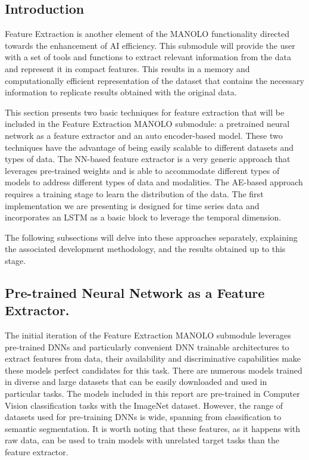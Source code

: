 \subsection{Introduction}

Feature Extraction is another element of the MANOLO functionality directed towards the enhancement of AI efficiency. This submodule will provide the user with a set of tools and functions to extract relevant information from the data and represent it in compact features. This results in a memory and computationally efficient representation of the dataset that contains the necessary information to replicate results obtained with the original data. 

This section presents two basic techniques for feature extraction that will be included in the Feature Extraction MANOLO submodule: a pretrained neural network as a feature extractor and an auto encoder-based model. These two techniques have the advantage of being easily scalable to different datasets and types of data. The NN-based feature extractor is a very generic approach that leverages pre-trained weights and is able to accommodate different types of models to address different types of data and modalities. The AE-based approach requires a training stage to learn the distribution of the data. The first implementation we are presenting is designed for time series data and incorporates an LSTM as a basic block to leverage the temporal dimension.

The following subsections will delve into these approaches separately, explaining the associated development methodology, and the results obtained up to this stage.


\subsection{Pre-trained Neural Network as a Feature Extractor.}
\label{subsec:2.3_featext_tech1}
The initial iteration of the Feature Extraction MANOLO submodule leverages pre-trained DNNs and particularly convenient DNN trainable architectures to extract features from data, their availability and discriminative capabilities make these models perfect candidates for this task. There are numerous models trained in diverse and large datasets that can be easily downloaded and used in particular tasks. The models included in this report are pre-trained in Computer Vision classification tasks with the ImageNet dataset. However, the range of datasets used for pre-training DNNs is wide, spanning from classification to semantic segmentation. It is worth noting that these features, as it happens with raw data, can be used to train models with unrelated target tasks than the feature extractor.


